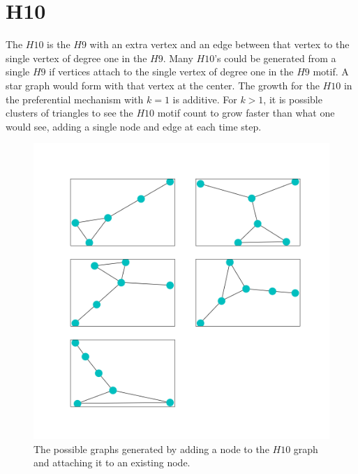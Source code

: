 \section{H10}
The $H10$ is the $H9$ with an extra vertex and an edge between that vertex to the 
single vertex of degree one in the $H9$. Many $H10$'s could be generated from a single $H9$ if vertices
attach to the single vertex of degree one in the $H9$ motif. A star graph would form
with that vertex at the center. The growth for the $H10$ in the preferential mechanism with $k=1$ is additive.
For $k>1$, it is possible clusters of triangles to see the $H10$ motif count to grow faster than what one would
see, adding a single node and edge at each time step. 

\begin{figure}[!ht]
    \includegraphics[width=12cm]{Images/H10_evolution.png}
    \centering
    \caption{The possible graphs generated by adding a node to the $H10$ graph 
    and attaching it to an existing node.}
\end{figure}

